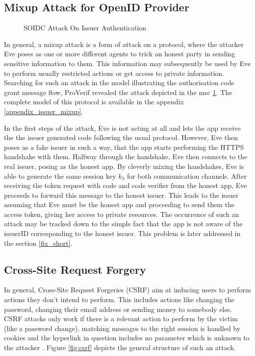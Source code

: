 \documentclass[11pt,twoside,a4paper,openright]{book}
\begin{document}
\subsection{Mixup Attack for OpenID Provider}

\begin{figure}[H]
    \centering
    
    \caption{SOIDC Attack On Issuer Authentication}
    \label{fig:msc_soidc_attack}
\end{figure}

In general, a mixup attack is a form of attack on a protocol, where the attacker Eve poses as one or more different agents to trick an honest party in sending sensitive information to them. This information may subsequently be used by Eve to perform usually restricted actions or get access to private information. Searching for such an attack in the model illustrating the authorisation code grant message flow, ProVerif revealed the attack depicted in the msc \ref{fig:msc_soidc_attack}. The complete model of this protocol is available in the appendix \ref{appendix_issuer_mixup}.

In the first steps of the attack, Eve is not acting at all and lets the app receive the the issuer generated code following the usual protocol. However, Eve then poses as a fake issuer in such a way, that the app starts performing the HTTPS handshake with them. Halfway through the handshake, Eve then connects to the real issuer, posing as the honest app. By cleverly mixing the handshakes, Eve is able to generate the same session key $k_3$ for both communication channels. After receiving the token request with code and code verifier from the honest app, Eve proceeds to forward this message to the honest issuer. This leads to the issuer assuming that Eve must be the honest app and proceeding to send them the access token, giving her access to private resources. The occurrence of such an attack may be tracked down to the simple fact that the app is not aware of the issuerID corresponding to the honest issuer. This problem is later addressed in the section \ref{fix_short}.


\subsection{Cross-Site Request Forgery}

In general, Cross-Site Request Forgeries (CSRF) aim at inducing users to perform actions they don't intend to perform. This includes actions like changing the password, changing their email address or sending money to somebody else. CSRF attacks only work if there is a relevant action to perform by the victim (like a password change), matching messages to the right session is handled by cookies and the hyperlink in question includes no parameter which is unknown to the attacker \cite{csrf}. Figure \ref{fig:csrf} depicts the general structure of such an attack.
\end{document}
